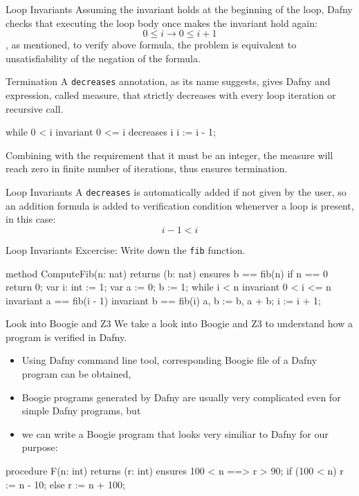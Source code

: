 \documentclass[10pt, compress]{beamer}
\begin{document}
\begin{frame}[fragile]{Loop Invariants}
Assuming the invariant holds at the beginning of the loop, Dafny checks that executing the loop body once makes the invariant hold again:
    $$0 \leq i \to 0 \leq i + 1$$
, as mentioned, to verify above formula, the problem is equivalent to unsatisfiability of the negation of the formula.

\end{frame}

\begin{frame}[fragile]{Termination}
A \verb|decreases| annotation, as its name suggests, gives Dafny and expression, called measure, that strictly decreases with every loop iteration or recursive call.
  \begin{verbnobox}[\footnotesize]
while 0 < i
   invariant 0 <= i
   decreases i
{
   i := i - 1;
}
  \end{verbnobox}
Combining with the requirement that it must be an integer, the measure will reach zero in finite number of iterations, thus ensures termination.
\end{frame}

\begin{frame}[fragile]{Loop Invariants}
A \verb|decreases| is automatically added if not given by the user, so an addition formula is added to verification condition whenerver a loop is present, in this case:
  $$i - 1 < i$$
\end{frame}

\begin{frame}[fragile]{Loop Invariants}
  Excercise: Write down the \verb|fib| function.
  \begin{verbnobox}[\footnotesize]
method ComputeFib(n: nat) returns (b: nat)
   ensures b == fib(n)
{
   if n == 0 { return 0; }
   var i: int := 1;
   var a := 0;
       b := 1;
   while i < n
      invariant 0 < i <= n
      invariant a == fib(i - 1)
      invariant b == fib(i)
   {
      a, b := b, a + b;
      i := i + 1;
   }
}
  \end{verbnobox}
\end{frame}

\begin{frame}[fragile]{Look into Boogie and Z3}
  We take a look into Boogie and Z3 to understand how a program is verified in Dafny.
  \begin{itemize}
  \item Using Dafny command line tool, corresponding Boogie file of a Dafny program can be obtained,
  \item Boogie programs generated by Dafny are usually very complicated even for simple Dafny programs, but
  \item we can write a Boogie program that looks very similiar to Dafny for our purpose:
  \end{itemize}
  \begin{verbnobox}[\footnotesize]
procedure F(n: int) returns (r: int)
  ensures 100 < n ==> r > 90;
{
  if (100 < n) {
    r := n - 10;
  } else {
    r := n + 100;
  }
}
  \end{verbnobox}
\end{frame}
\end{document}
